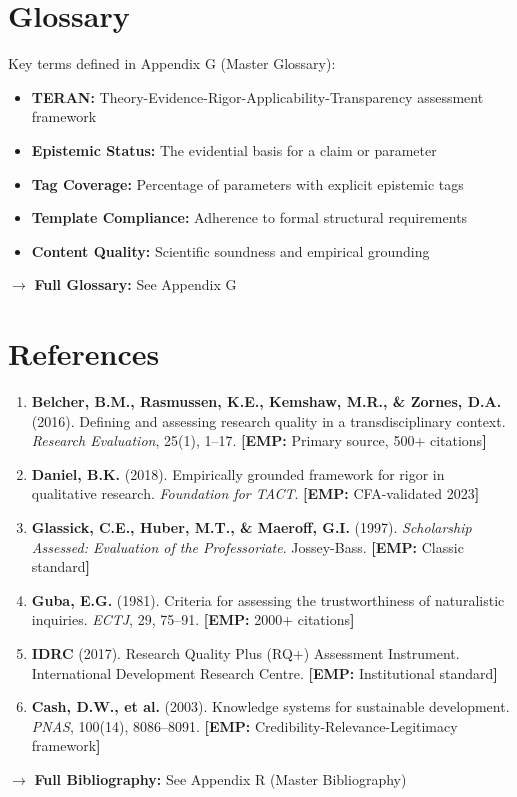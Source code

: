 \documentclass[11pt,a4paper]{article}
\newcommand{\tagEMP}[1]{\textcolor{empgreen}{\textbf{[EMP:} #1\textbf{]}}}
\begin{document}
\section*{Glossary}

Key terms defined in Appendix G (Master Glossary):
\begin{itemize}
    \item \textbf{TERAN:} Theory-Evidence-Rigor-Applicability-Transparency assessment framework
    \item \textbf{Epistemic Status:} The evidential basis for a claim or parameter
    \item \textbf{Tag Coverage:} Percentage of parameters with explicit epistemic tags
    \item \textbf{Template Compliance:} Adherence to formal structural requirements
    \item \textbf{Content Quality:} Scientific soundness and empirical grounding
\end{itemize}

$\rightarrow$ \textbf{Full Glossary:} See Appendix G


\section*{References}

\begin{enumerate}
    \item \textbf{Belcher, B.M., Rasmussen, K.E., Kemshaw, M.R., \& Zornes, D.A.} (2016). Defining and assessing research quality in a transdisciplinary context. \emph{Research Evaluation}, 25(1), 1--17. \tagEMP{Primary source, 500+ citations}
    
    \item \textbf{Daniel, B.K.} (2018). Empirically grounded framework for rigor in qualitative research. \emph{Foundation for TACT}. \tagEMP{CFA-validated 2023}
    
    \item \textbf{Glassick, C.E., Huber, M.T., \& Maeroff, G.I.} (1997). \emph{Scholarship Assessed: Evaluation of the Professoriate}. Jossey-Bass. \tagEMP{Classic standard}
    
    \item \textbf{Guba, E.G.} (1981). Criteria for assessing the trustworthiness of naturalistic inquiries. \emph{ECTJ}, 29, 75--91. \tagEMP{2000+ citations}
    
    \item \textbf{IDRC} (2017). Research Quality Plus (RQ+) Assessment Instrument. International Development Research Centre. \tagEMP{Institutional standard}
    
    \item \textbf{Cash, D.W., et al.} (2003). Knowledge systems for sustainable development. \emph{PNAS}, 100(14), 8086--8091. \tagEMP{Credibility-Relevance-Legitimacy framework}
\end{enumerate}

$\rightarrow$ \textbf{Full Bibliography:} See Appendix R (Master Bibliography)

\end{document}
